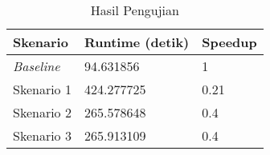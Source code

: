 \begin {table}[h]
\begin{center}
\caption {Hasil Pengujian}

    \begin{tabular}{|p{4cm}|p{4cm}|p{4cm}|}

    \hline
    \rowcolor{gray!10}
    Skenario & Runtime (detik) & Speedup \\
    \hline

    \emph{Baseline} & 94.631856 & 1 \\
    \hline
    
    Skenario 1 & 424.277725 & 0.21 \\
    \hline
    
    Skenario 2 & 265.578648 & 0.4 \\
    \hline
    
    Skenario 3 & 265.913109 & 0.4 \\
    \hline

    \end{tabular}

\end{center}
\end{table}
